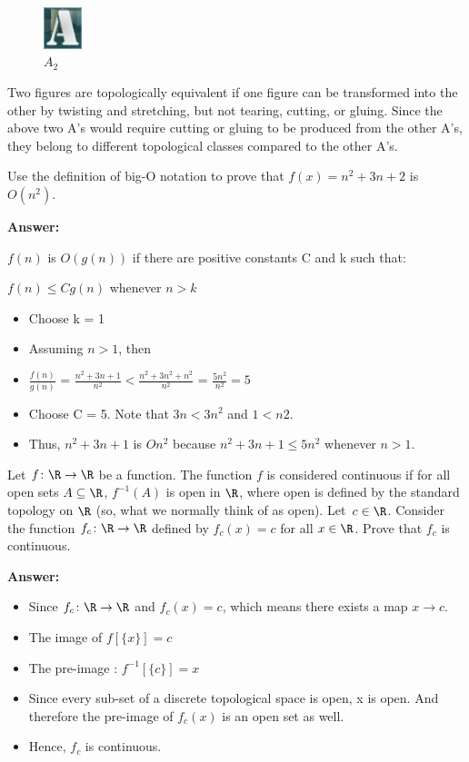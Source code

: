\documentclass{article}
\begin{document}
\begin{figure}[h]
    \centering
    \includegraphics[width=0.1\textwidth]{A2}
    \caption{$A_2$}
    \label{fig:$A_2$}
\end{figure}

Two figures are topologically equivalent if one figure can be transformed into the other by twisting and stretching, but not tearing, cutting, or gluing. Since the above two A's would require cutting or gluing to be produced from the other A's, they belong to different topological classes compared to the other A's.


\nextprob{}
Use the definition of big-O notation to prove that $f(x)=n^2 + 3n +2$ is
$O(n^2)$.

\textbf{Answer:}

$f(n)$ is $O(g(n))$ if there are positive constants C and k such that:

$f(n) \leq C g(n)$ whenever $n > k$ 
\begin{itemize}
	\item Choose k = 1
	\item Assuming $n > 1$, then
	\item $\frac{f(n)}{g(n)}$ = $\frac{n^2 + 3n + 1}{n^2} < \frac{n^2 + 3n^2 + n^2}{n^2}$ = $\frac{5n^2}{n^2} = 5$
	\item Choose C = 5. Note that $3n < 3n^2$ and $1 < n2$.
	\item Thus, $n^2 + 3n + 1$ is $O{n^2}$ because $n^2 + 3n + 1 \leq 5n^2$ whenever $n > 1$.
\end{itemize}

\nextprob{}
Let $f \colon \R \to \R$ be a function.
The function $f$ is considered continuous if for all open sets $A \subseteq \R$,
$f^{-1}(A)$ is open in $\R$, where open is defined by the standard topology on
$\R$ (so, what we normally think of as open).  Let~$c \in \R$.  Consider the
function $f_c \colon \R \to \R$ defined by $f_c(x) = c$ for all $x \in \R$. Prove
that $f_c$ is continuous.

\textbf{Answer:} 

\begin{itemize}
	\item Since $f_c \colon \R \to \R$ and  $f_c(x) = c$, which means there exists a map $x \to c$.
	\item The image of $f[\{x\}] = c$
	\item The pre-image : $f^{-1}[\{c\}] = x$
	\item Since every sub-set of a discrete topological space is open, x is open. And therefore the pre-image of $f_c(x)$ is an open set as well.
	\item Hence, $f_c$ is continuous.
\end{itemize}
\end{document}
